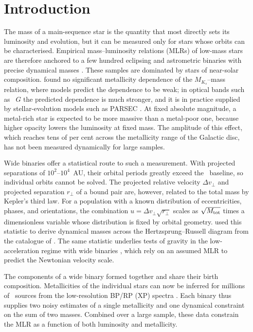 \section{Introduction}
\label{sec:intro}

The mass of a main-sequence star is the quantity that most directly sets its
luminosity and evolution, but it can be measured only for stars whose orbits
can be characterised.  Empirical mass--luminosity relations (MLRs) of low-mass
stars are therefore anchored to a few hundred eclipsing and astrometric
binaries with precise dynamical masses
\citep{Delfosse2000,Torres2010,Mann2019}.  These samples are dominated by
stars of near-solar composition.  \citet{Mann2019} found no significant
metallicity dependence of the $M_{K_s}$--mass relation, where models predict
the dependence to be weak; in optical bands such as \gaia\ $G$ the predicted
dependence is much stronger, and it is in practice supplied by
stellar-evolution models such as PARSEC \citep{Bressan2012PARSEC}.  At fixed absolute magnitude, a metal-rich star is
expected to be more massive than a metal-poor one, because higher opacity
lowers the luminosity at fixed mass.  The amplitude of this effect, which
reaches tens of per cent across the metallicity range of the Galactic disc,
has not been measured dynamically for large samples.

Wide binaries offer a statistical route to such a measurement.  With projected
separations of $10^2$--$10^4$~AU, their orbital periods greatly exceed the
\gaia\ baseline, so individual orbits cannot be solved.  The projected
relative velocity $\Delta v_\perp$ and projected separation $r_\perp$ of a
bound pair are, however, related to the total mass by Kepler's third law.
For a population with a known distribution of eccentricities, phases, and
orientations, the combination $u=\Delta v_\perp\sqrt{r_\perp}$ scales as
$\sqrt{M_{\rm tot}}$ times a dimensionless variable whose distribution is fixed
by orbital geometry.  \citet{Hwang2024DynamicalMasses} used this statistic to
derive dynamical masses across the Hertzsprung--Russell diagram from the
catalogue of \citet{ElBadry2021MillionBinaries}.  The same statistic underlies
tests of gravity in the low-acceleration regime with wide binaries
\citep{Chae2023,Banik2024}, which rely on an assumed MLR to predict the
Newtonian velocity scale.

The components of a wide binary formed together and share their birth
composition.  Metallicities of the individual stars can now be inferred for
millions of \gaia\ sources from the low-resolution BP/RP (XP) spectra
\citep{GaiaCollaboration2023DR3,Li2026JCaPS}.  Each binary thus supplies two
noisy estimates of a single metallicity and one dynamical constraint on the sum
of two masses.  Combined over a large sample, these data constrain the MLR as a
function of both luminosity and metallicity.

